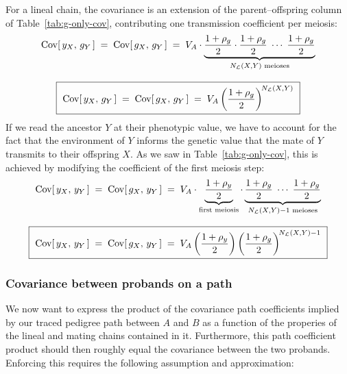 \documentclass[12pt]{article}
\begin{document}
For a lineal chain, the covariance is an extension of the parent--offspring column of Table~\ref{tab:g-only-cov}, contributing one transmission coefficient per meiosis:
\begin{equation}\label{eq:lineal-g}
\begin{gathered}
    \mathrm{Cov}[\,y_X,\, g_{Y}\,] \;=\; \mathrm{Cov}[\,g_X,\, g_{Y}\,] \;=\; V_A \cdot
    \underbrace{\frac{1+\rho_g}{2} \cdot \frac{1+\rho_g}{2} \;\cdots\; \frac{1+\rho_g}{2}}_{N_{\mathcal{L}}(X,Y) \text{ meioses}} \\[8pt]
    \boxed{\ \mathrm{Cov}[\,y_X,\, g_{Y}\,] \;=\; \mathrm{Cov}[\,g_X,\, g_{Y}\,] \;=\; V_A
    \left(\frac{1+\rho_g}{2}\right)^{\!N_{\mathcal{L}}(X,Y)} \ }
\end{gathered}
\end{equation}
If we read the ancestor $Y$ at their phenotypic value, we have to account for the fact that the environment of $Y$ informs the genetic value that the mate of $Y$ transmits to their offspring $X$.
As we saw in Table~\ref{tab:g-only-cov}, this is achieved by modifying the coefficient of the first meiosis step:
\begin{equation}\label{eq:lineal-y}
\begin{gathered}
    \mathrm{Cov}[\,y_X,\, y_{Y}\,] \;=\; \mathrm{Cov}[\,g_X,\, y_{Y}\,] \;=\; V_A \cdot
    \underbrace{\frac{1+\rho_y}{2}}_{\text{first meiosis}} \cdot
    \underbrace{\frac{1+\rho_g}{2} \;\cdots\; \frac{1+\rho_g}{2}}_{N_{\mathcal{L}}(X,Y) - 1 \text{ meioses}} \\[8pt]
    \boxed{\ \mathrm{Cov}[\,y_X,\, y_{Y}\,] \;=\; \mathrm{Cov}[\,g_X,\, y_{Y}\,] \;=\; V_A
    \left(\frac{1+\rho_y}{2}\right)
    \left(\frac{1+\rho_g}{2}\right)^{\!N_{\mathcal{L}}(X,Y) - 1} \ }
\end{gathered}
\end{equation}

\subsubsection{Covariance between probands on a path}\label{sec:am-probands}

We now want to express the product of the covariance path coefficients implied by our traced pedigree path between $A$ and $B$ as a function of the properies of the lineal and mating chains contained in it.
Furthermore, this path coefficient product should then roughly equal the covariance between the two probands.
Enforcing this requires the following assumption and approximation:
\end{document}
